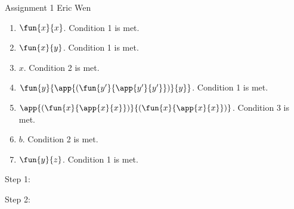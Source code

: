 \documentclass[11pt]{article}
\begin{document}
\hwtitle
  {Assignment 1}
  {Eric Wen} %


\begin{enumerate}
\item $\fun{x}{x}$. Condition 1 is met.
\item $\fun{x}{y}$. Condition 1 is met.
\item $x$. Condition 2 is met.
\item $\fun{y}{\app{(\fun{y'}{\app{y'}{y'}})}{y}}$. Condition 1 is met.
\item $\app{(\fun{x}{\app{x}{x}})}{(\fun{x}{\app{x}{x}})}$. Condition 3 is met.
\item $b$. Condition 2 is met.
\item $\fun{y}{z}$. Condition 1 is met.
\end{enumerate}


%
%
%
%
%

Step 1:

\begin{mathpar}
\end{mathpar}

Step 2:
\end{document}
